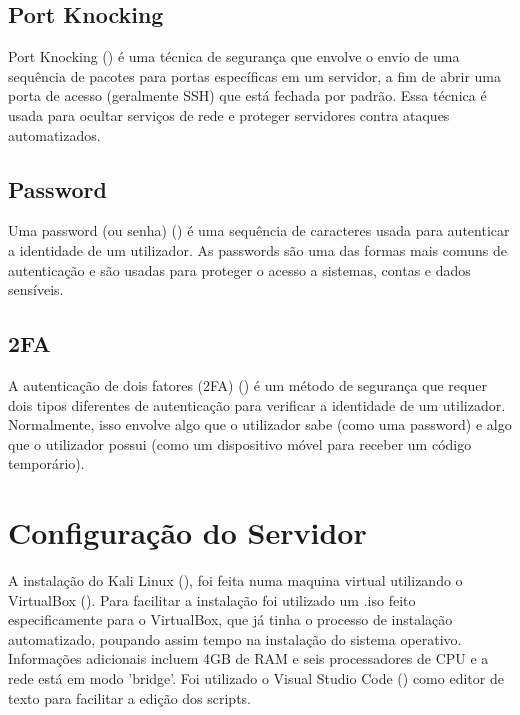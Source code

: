 \documentclass[a4paper]{article}
\begin{document}
\newpage
\subsection{Port Knocking}
Port Knocking (\cite{portknocking}) é uma técnica de segurança que envolve o envio de uma sequência de pacotes para portas específicas em um servidor,
a fim de abrir uma porta de acesso (geralmente SSH) que está fechada por padrão. Essa técnica é usada para ocultar
serviços de rede e proteger servidores contra ataques automatizados.

\subsection{Password}
Uma password (ou senha) (\cite{password}) é uma sequência de caracteres usada para autenticar a identidade de um utilizador.
As passwords são uma das formas mais comuns de autenticação e são usadas para proteger o acesso a sistemas, contas e dados sensíveis.

\subsection{2FA}
A autenticação de dois fatores (2FA) (\cite{2fa}) é um método de segurança que requer dois tipos diferentes de autenticação para verificar
a identidade de um utilizador. Normalmente, isso envolve algo que o utilizador sabe (como uma password) e algo que o
utilizador possui (como um dispositivo móvel para receber um código temporário).

\newpage
\section{Configuração do Servidor}\label{obj}
A instalação do Kali Linux (\cite{kali}), foi feita numa maquina virtual utilizando o VirtualBox (\cite{virtualbox}).
Para facilitar a instalação foi utilizado um .iso feito especificamente para o VirtualBox, que já tinha o processo de instalação
automatizado, poupando assim tempo na instalação do sistema operativo.\\

Informações adicionais incluem 4GB de RAM e seis processadores de CPU e a rede está em modo 'bridge'.
Foi utilizado o Visual Studio Code (\cite{vscode}) como editor de texto para facilitar a edição dos scripts.\\
\end{document}
